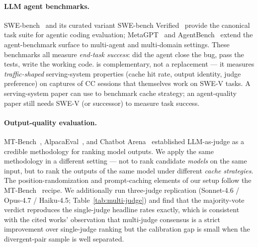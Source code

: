 \paragraph{LLM agent benchmarks.}
SWE-bench~\cite{swe-bench-iclr} and its curated variant
SWE-bench Verified~\cite{swe-bench-verified} provide the canonical
task suite for agentic coding evaluation; MetaGPT~\cite{metagpt-paper}
and AgentBench~\cite{agentbench} extend the agent-benchmark surface to
multi-agent and multi-domain settings. These benchmarks all measure
\emph{end-task success}: did the agent close the bug, pass the tests,
write the working code. \dataset{} is complementary, not a replacement
--- it measures \emph{traffic-shaped} serving-system properties (cache
hit rate, output identity, judge preference) on captures of CC sessions
that themselves work on SWE-V tasks. A serving-system paper can use
\dataset{} to benchmark cache strategy; an agent-quality paper still
needs SWE-V (or successor) to measure task success.

\paragraph{Output-quality evaluation.}
MT-Bench~\cite{mtbench}, AlpacaEval~\cite{alpacaeval}, and Chatbot
Arena~\cite{chatbot-arena} established LLM-as-judge as a credible
methodology for ranking model outputs. We apply the same methodology
in a different setting --- not to rank candidate \emph{models} on the
same input, but to rank the outputs of the same model under different
\emph{cache strategies}. The position-randomization and
prompt-caching elements of our setup follow the
MT-Bench~\cite{mtbench} recipe. We additionally run three-judge
replication (Sonnet-4.6 / Opus-4.7 / Haiku-4.5;
Table~\ref{tab:multi-judge}) and find that the majority-vote
verdict reproduces the single-judge headline rates exactly, which
is consistent with the cited works' observation that multi-judge
consensus is a strict improvement over single-judge ranking but the
calibration gap is small when the divergent-pair sample is well
separated.
